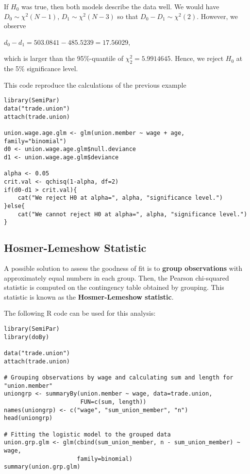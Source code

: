 \documentclass[11pt]{article}
\begin{document}
If \(H_0\) was true, then both models describe the data well. We would have \(D_0 \sim \chi^2(N - 1)\), \(D_1 \sim \chi^2(N - 3)\) so that \(D_0 - D_1 \sim \chi^2(2)\). However, we observe

\begin{center}
\(d_0 - d_1 = 503.0841 - 485.5239 = 17.56029\),
\end{center}

which is larger than the 95\%-quantile of \(\chi^2_2 = 5.9914645\). Hence, we reject \(H_0\) at the 5\% significance level.

This code reproduce the calculations of the previous example

\begin{verbatim}
library(SemiPar)
data("trade.union")
attach(trade.union)

union.wage.age.glm <- glm(union.member ~ wage + age, family="binomial")
d0 <- union.wage.age.glm$null.deviance
d1 <- union.wage.age.glm$deviance

alpha <- 0.05
crit.val <- qchisq(1-alpha, df=2)
if(d0-d1 > crit.val){
    cat("We reject H0 at alpha=", alpha, "significance level.")
}else{
    cat("We cannot reject H0 at alpha=", alpha, "significance level.")
}
\end{verbatim}

\subsection{Hosmer-Lemeshow Statistic}

A possible solution to assess the goodness of fit is to \textbf{group observations} with approximately equal numbers in each group. Then, the Pearson chi-squared statistic is computed on the contingency table obtained by grouping. This statistic is known as the \textbf{Hosmer-Lemeshow statistic}.

The following R code can be used for this analysis:
\begin{verbatim}
library(SemiPar)
library(doBy)

data("trade.union")
attach(trade.union)

# Grouping observations by wage and calculating sum and length for "union.member"
uniongrp <- summaryBy(union.member ~ wage, data=trade.union,
                      FUN=c(sum, length))
names(uniongrp) <- c("wage", "sum_union_member", "n")
head(uniongrp)

# Fitting the logistic model to the grouped data
union.grp.glm <- glm(cbind(sum_union_member, n - sum_union_member) ~ wage,
                     family=binomial)
summary(union.grp.glm)
\end{verbatim}
\end{document}
